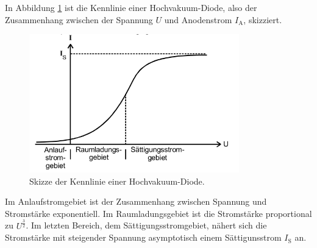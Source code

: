 In Abbildung \ref{fig:Kennlinie} ist die Kennlinie einer Hochvakuum-Diode,
also der Zusammenhang zwischen der Spannung $U$ und Anodenstrom $I_\text{A}$,
skizziert.

\begin{figure}
  \centering
  \includegraphics[height=6cm]{SommerAlbum15/Kennlinie.png}
  \caption{Skizze der Kennlinie einer Hochvakuum-Diode.\cite{anleitung}}
  \label{fig:Kennlinie}
\end{figure}

\FloatBarrier

Im Anlaufstromgebiet ist der Zusammenhang zwischen Spannung und Stromstärke
exponentiell. Im Raumladungsgebiet ist die Stromstärke proportional zu
$U^{\frac{3}{2}}$. Im letzten Bereich, dem Sättigungsstromgebiet, nähert
sich die Stromstärke mit steigender Spannung asymptotisch
einem Sättigunsstrom $I_\text{S}$ an.

